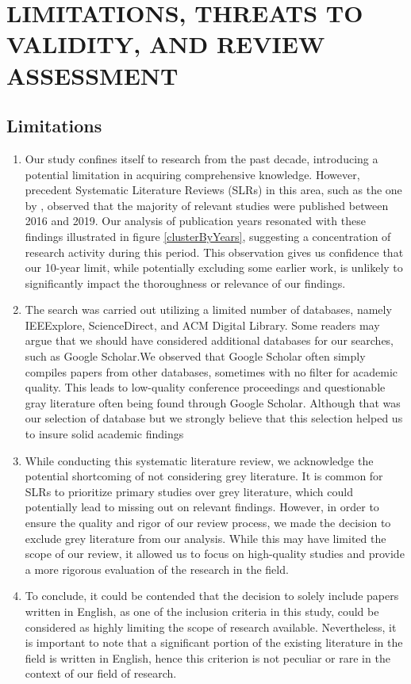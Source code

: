 \documentclass{svproc}
\begin{document}
\section{LIMITATIONS, THREATS TO VALIDITY, AND REVIEW ASSESSMENT}
\label{LIMITATIONS, THREATS TO VALIDITY, AND REVIEW ASSESSMENT}
\subsection{Limitations}
\label{limitation}
\begin{enumerate}

\item Our study confines itself to research from the past decade, introducing a potential limitation in acquiring comprehensive knowledge. However, precedent Systematic Literature Reviews (SLRs) in this area, such as the one by \cite{AI_IN_Education_SLR}, observed that the majority of relevant studies were published between 2016 and 2019. Our analysis  of publication years resonated with these findings illustrated in figure \ref{clusterByYears}, suggesting a concentration of research activity during this period. This observation gives us confidence that our 10-year limit, while potentially excluding some earlier work, is unlikely to significantly impact the thoroughness or relevance of our findings.

\item The search was carried out utilizing a limited number of databases, namely IEEExplore, ScienceDirect, and ACM Digital Library. Some readers may argue that we should have considered additional databases for our searches, such as Google Scholar.We observed that Google Scholar often simply compiles papers from other databases, sometimes with no filter for academic quality. This leads to low-quality conference proceedings and questionable gray literature often being found through Google Scholar. Although that was our selection of database but we strongly believe that this selection helped us to insure solid academic findings 


    \item While conducting this systematic literature review, we acknowledge the potential shortcoming of not considering grey literature. It is common for SLRs to prioritize primary studies over grey literature, which could potentially lead to missing out on relevant findings. However, in order to ensure the quality and rigor of our review process, we made the decision to exclude grey literature from our analysis. While this may have limited the scope of our review, it allowed us to focus on high-quality studies and provide a more rigorous evaluation of the research in the field.

    \item To conclude, it could be contended that the decision to solely include papers written in English, as one of the inclusion criteria in this study, could be considered as highly limiting the scope of research available. Nevertheless, it is important to note that a significant portion of the existing literature in the field is written in English, hence this criterion is not peculiar or rare in the context of our field of research.


\end{enumerate}
\end{document}
